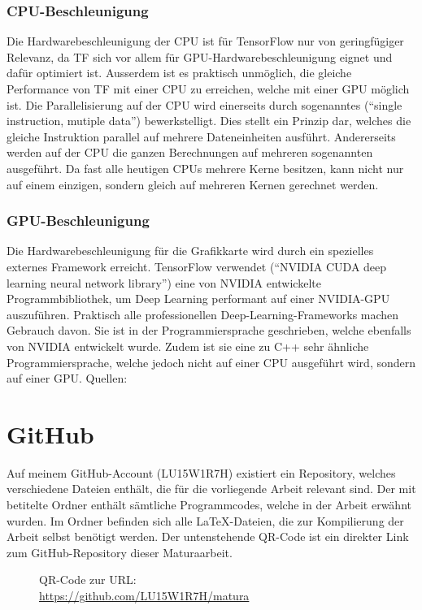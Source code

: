 \begin{appendices}
\subsection*{CPU-Beschleunigung}
Die Hardwarebeschleunigung der CPU ist für TensorFlow nur von geringfügiger
Relevanz, da TF sich vor allem für GPU-Hardwarebeschleunigung eignet
und dafür optimiert ist. Ausserdem ist es praktisch unmöglich, die gleiche
Performance von TF mit einer CPU zu erreichen, welche mit einer GPU möglich ist.
\para{}
Die Parallelisierung auf der CPU wird einerseits durch sogenanntes 
(``single instruction, mutiple data'') bewerkstelligt. Dies stellt ein Prinzip
dar, welches die gleiche Instruktion parallel auf mehrere Dateneinheiten
ausführt.
Andererseits werden auf der CPU die ganzen Berechnungen auf mehreren sogenannten
 ausgeführt. Da fast alle heutigen CPUs mehrere Kerne
besitzen, kann nicht nur auf einem einzigen, sondern gleich auf mehreren
Kernen gerechnet werden.

\subsection*{GPU-Beschleunigung}
Die Hardwarebeschleunigung für die Grafikkarte wird durch ein spezielles
externes Framework erreicht. TensorFlow verwendet  (``NVIDIA CUDA
deep learning neural network library'') eine von
NVIDIA entwickelte Programmbibliothek, um Deep Learning performant auf einer NVIDIA-GPU
auszuführen. Praktisch alle professionellen Deep-Learning-Frameworks machen
Gebrauch davon. Sie ist in der Programmiersprache
 geschrieben, welche ebenfalls von NVIDIA entwickelt wurde. Zudem
ist sie eine zu C++ sehr ähnliche Programmiersprache, welche jedoch nicht auf
einer CPU ausgeführt wird, sondern auf einer GPU.
\para{}
Quellen: \cite{net:cudnn}


\chapter{GitHub}
Auf meinem GitHub-Account (LU15W1R7H) existiert ein Repository, welches verschiedene
Dateien enthält, die für die vorliegende Arbeit relevant sind.
Der mit  betitelte Ordner enthält sämtliche
Programmcodes, welche in der Arbeit erwähnt wurden. Im Ordner 
befinden sich alle \LaTeX{}-Dateien, die zur Kompilierung der Arbeit selbst
benötigt werden. Der untenstehende QR-Code ist ein direkter Link zum
GitHub-Repository dieser Maturaarbeit.
\para{}
\begin{wrapfigure}{R}{3.5cm}
  \centering
  \caption{QR-Code zur URL:\\ \protect\url{https://github.com/LU15W1R7H/matura}}
\end{wrapfigure}



\end{appendices}

